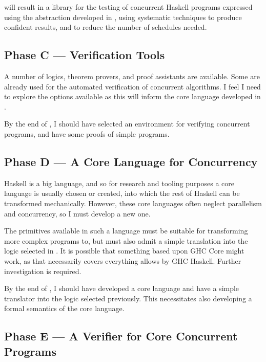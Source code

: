  will result in a library for the testing of concurrent
Haskell programs expressed using the abstraction developed in
, using systematic techniques to produce confident results,
and to reduce the number of schedules needed.

\subsection{Phase C --- Verification Tools}
\label{sec:proposal-strategy-tools}


A number of logics, theorem provers, and proof assistants are
available. Some are already used for the automated verification of
concurrent algorithms. I feel I need to explore
the options available as this will inform the core language developed
in .

By the end of , I should have selected an environment for
verifying concurrent programs, and have some proofs of simple
programs.

\subsection{Phase D --- A Core Language for Concurrency}
\label{sec:proposal-strategy-core}


Haskell is a big language, and so for research and tooling purposes a
core language is usually chosen or created, into which the rest of
Haskell can be transformed mechanically. However, these core languages
often neglect parallelism and concurrency, so I must develop a new
one.

The primitives available in such a language must be suitable for
transforming more complex programs to, but must also admit a simple
translation into the logic selected in . It is possible that
something based upon GHC Core might work, as that necessarily covers
everything allows by GHC Haskell. Further investigation is required.

By the end of , I should have developed a core language and
have a simple translator into the logic selected previously. This
necessitates also developing a formal semantics of the core language.

\subsection{Phase E --- A Verifier for Core Concurrent Programs}
\label{sec:proposal-strategy-verifier}

